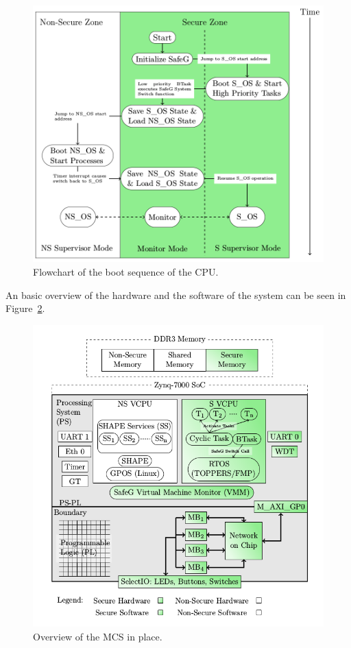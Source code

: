 \begin{figure}[H]
\centering
\includegraphics[width=\textwidth]{./img/literature_modeswitch.png}
\caption{Flowchart of the boot sequence of the CPU. \cite{zaki2016}}\label{fig:modeswitch}
\end{figure}

An basic overview of the hardware and the software of the system can be seen in Figure~\ref{fig:system_overview}.

\begin{figure}[H]
\centering
\includegraphics[width=\textwidth]{./img/literature_overview.png}
\caption{Overview of the MCS in place.\cite{zaki2016}}\label{fig:system_overview}
\end{figure}


